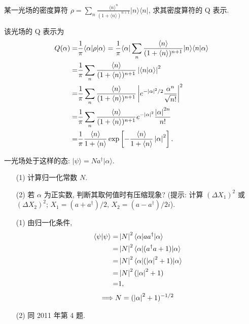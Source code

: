 \documentclass{assignment}
\begin{document}
\begin{prob}
    某一光场的密度算符 $\rho=\sum_n\frac{\langle n\rangle^n}{(1+\langle n\rangle)^{n+1}}\lvert n\rangle\langle n\rvert$, 求其密度算符的 Q 表示.
\end{prob}
\begin{sol}
    该光场的 Q 表示为
    \begin{align}
        \notag Q(\alpha)=&\frac{1}{\pi}\langle\alpha\rvert\rho\lvert\alpha\rangle=\frac{1}{\pi}\langle\alpha\rvert\sum_n\frac{\langle n\rangle}{(1+\langle n\rangle)^{n+1}}\lvert n\rangle\langle n\vert\alpha\rangle\\
        \notag=&\frac{1}{\pi}\sum_n\frac{\langle n\rangle}{(1+\langle n\rangle)^{n+1}}\left\lvert\langle n\vert\alpha\rangle\right\rvert^2\\
        \notag=&\frac{1}{\pi}\sum_n\frac{\langle n\rangle}{(1+\langle n\rangle)^{n+1}}\left\lvert e^{-\left\lvert\alpha\right\rvert^2/2}\frac{\alpha^n}{\sqrt{n!}}\right\rvert^2\\
        \notag=&\frac{1}{\pi}\sum_n\frac{\langle n\rangle}{(1+\langle n\rangle)^{n+1}}e^{-\left\lvert\alpha\right\rvert^2}\frac{\left\lvert\alpha\right\rvert^{2n}}{n!}\\
        =&\frac{1}{\pi}\frac{\langle n\rangle}{1+\langle n\rangle}\exp\left[-\frac{\langle n\rangle}{1+\langle n\rangle}\left\lvert\alpha\right\rvert^2\right].
    \end{align}
\end{sol}

\begin{prob}
    一光场处于这样的态: $\lvert\psi\rangle=Na^{\dagger}\lvert\alpha\rangle$.
    \begin{itemize}
        \item[(1)] 计算归一化常数 $N$.
        \item[(2)] 若 $\alpha$ 为正实数, 判断其取何值时有压缩现象? (提示: 计算 $(\Delta X_1)^2$ 或 $(\Delta X_2)^2$; $X_1=(a+a^{\dagger})/2$, $X_2=(a-a^{\dagger})/2i$).
    \end{itemize}
\end{prob}
\begin{sol}
    \begin{itemize}
        \item[(1)] 由归一化条件,
        \begin{align}
            \notag\langle\psi\vert\psi\rangle=&\left\lvert N\right\rvert^2\langle\alpha\rvert aa^{\dagger}\lvert\alpha\rangle\\
            \notag=&\left\lvert N\right\rvert^2\langle\alpha\rvert(a^{\dagger}a+1)\lvert\alpha\rangle\\
            \notag=&\left\lvert N\right\rvert^2\langle\alpha\rvert(\left\lvert\alpha\right\rvert^2+1)\lvert\alpha\rangle\\
            \notag=&\left\lvert N\right\rvert^2(\left\lvert\alpha\right\rvert^2+1)\\
            =&1,
        \end{align}
        \begin{align}
            \Longrightarrow N=(\left\lvert\alpha\right\rvert^2+1)^{-1/2}
        \end{align}
        \item[(2)] 同 2011 年第 4 题.
    \end{itemize}
\end{sol}
\end{document}
